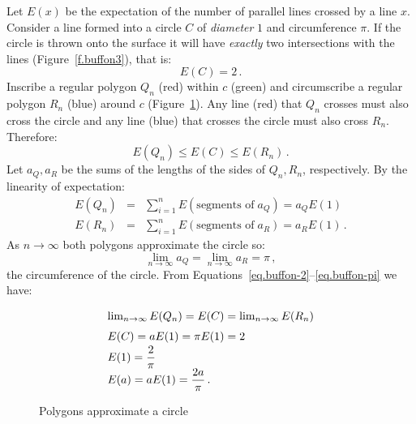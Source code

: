Let $E(x)$ be the expectation of the number of parallel lines crossed by a line $x$. Consider a line formed into a circle $C$ of \emph{diameter} $1$ and circumference $\pi$. If the circle is thrown onto the surface it will have \emph{exactly} two intersections with the lines (Figure~\ref{f.buffon3}), that is:
\begin{equation}\label{eq.buffon-2}
E(C)=2\,.
\end{equation}
Inscribe a regular polygon $Q_n$ (red) within $c$ (green) and circumscribe a regular polygon $R_n$ (blue) around $c$ (Figure~\ref{f.buffon4}). Any line (red) that $Q_n$ crosses must also cross the circle and any line (blue) that crosses the circle must also cross $R_n$. Therefore:
\begin{equation}\label{eq.buffon3}
E(Q_n)\leq E(C)\leq E(R_n)\,.
\end{equation}
Let $a_Q, a_R$ be the sums of the lengths of the sides of $Q_n,R_n$, respectively. By the linearity of expectation:
\begin{eqnarray}\label{eq.buffon1a}
E(Q_n)&=&\sum_{i=1}^n E(\textrm{segments of}\;a_Q)=a_QE(1)\\
\label{eq.buffon1b}E(R_n)&=&\sum_{i=1}^n E(\textrm{segments of}\;a_R)=a_RE(1)\,. 
\end{eqnarray}
As $n\rightarrow\infty$ both polygons approximate the circle so:
\begin{equation}\label{eq.buffon-pi}
\lim_{n\rightarrow\infty}a_Q = \lim_{n\rightarrow\infty} a_R=\pi\,,
\end{equation}
the circumference of the circle. From Equations~\ref{eq.buffon-2}--\ref{eq.buffon-pi} we have:
\[
\renewcommand*{\arraystretch}{1.5}
\begin{array}{l}
\lim_{n\rightarrow\infty}E(Q_n)=E(C) =\lim_{n\rightarrow\infty}E(R_n)\\
E(C)=aE(1) =\pi E(1) = 2\\
E(1)=\disfrac{2}{\pi}\\
E(a)=aE(1)=\disfrac{2a}{\pi}\,.
\end{array}
\]
\begin{figure}[bt]
\begin{center}
\end{center}
\caption{Polygons approximate a circle}\label{f.buffon4}
\end{figure}

